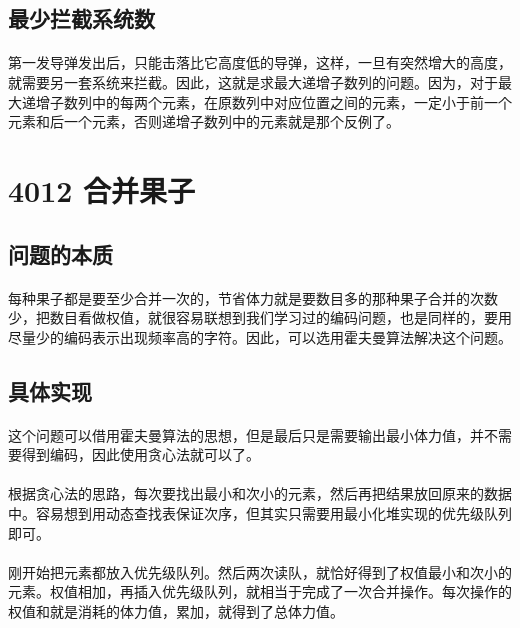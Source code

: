 \documentclass[UTF-8, 12pt]{ctexart}
\begin{document}
    \subsection{最少拦截系统数}
    \paragraph{}
    第一发导弹发出后，只能击落比它高度低的导弹，这样，一旦有突然增大的高度，就需要另一套系统来拦截。因此，这就是求最大递增子数列的问题。因为，对于最大递增子数列中的每两个元素，在原数列中对应位置之间的元素，一定小于前一个元素和后一个元素，否则递增子数列中的元素就是那个反例了。
   
\section{4012 合并果子}
    \subsection{问题的本质}
    \paragraph{}
    每种果子都是要至少合并一次的，节省体力就是要数目多的那种果子合并的次数少，把数目看做权值，就很容易联想到我们学习过的编码问题，也是同样的，要用尽量少的编码表示出现频率高的字符。因此，可以选用霍夫曼算法解决这个问题。
    
    \subsection{具体实现}
    \paragraph{}
    这个问题可以借用霍夫曼算法的思想，但是最后只是需要输出最小体力值，并不需要得到编码，因此使用贪心法就可以了。
    \paragraph{}
    根据贪心法的思路，每次要找出最小和次小的元素，然后再把结果放回原来的数据中。容易想到用动态查找表保证次序，但其实只需要用最小化堆实现的优先级队列即可。
    \paragraph{}
    刚开始把元素都放入优先级队列。然后两次读队，就恰好得到了权值最小和次小的元素。权值相加，再插入优先级队列，就相当于完成了一次合并操作。每次操作的权值和就是消耗的体力值，累加，就得到了总体力值。
    
\end{document}
